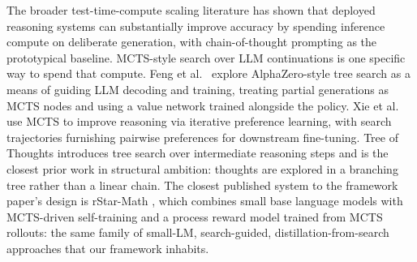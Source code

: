 The broader test-time-compute scaling literature
\citep{snell2024scaling, openai2024o1} has shown that deployed
reasoning systems can substantially improve accuracy by spending
inference compute on deliberate generation, with chain-of-thought
prompting \citep{wei2022cot} as the prototypical baseline.
MCTS-style search over LLM continuations is one specific way to spend
that compute. Feng et al.\ \citep{feng2023alphazerollm} explore
AlphaZero-style tree search as a means of guiding LLM decoding and
training, treating partial generations as MCTS nodes and using a value
network trained alongside the policy. Xie et al.\ \citep{xie2024monte}
use MCTS to improve reasoning via iterative preference learning, with
search trajectories furnishing pairwise preferences for downstream
fine-tuning. Tree of Thoughts \citep{yao2023tree} introduces tree
search over intermediate reasoning steps and is the closest prior work
in structural ambition: thoughts are explored in a branching tree
rather than a linear chain. The closest published system to the
framework paper's design is rStar-Math
\citep{guan2025rstarmath}, which combines small base language models
with MCTS-driven self-training and a process reward model trained from
MCTS rollouts: the same family of small-LM, search-guided,
distillation-from-search approaches that our framework inhabits.

